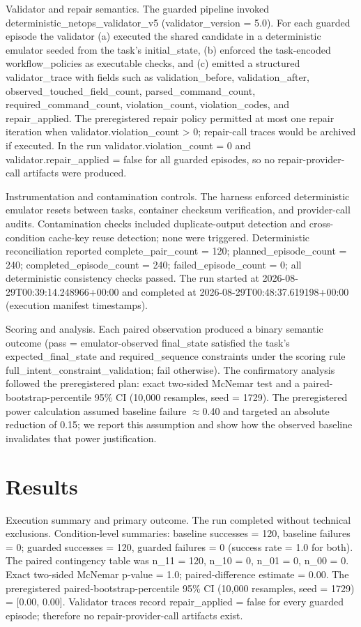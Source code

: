 \documentclass[conference]{IEEEtran}
\begin{document}
Validator and repair semantics. The guarded pipeline invoked deterministic\_netops\_validator\_v5 (validator\_version = 5.0). For each guarded episode the validator (a) executed the shared candidate in a deterministic emulator seeded from the task's initial\_state, (b) enforced the task-encoded workflow\_policies as executable checks, and (c) emitted a structured validator\_trace with fields such as validation\_before, validation\_after, observed\_touched\_field\_count, parsed\_command\_count, required\_command\_count, violation\_count, violation\_codes, and repair\_applied. The preregistered repair policy permitted at most one repair iteration when validator.violation\_count > 0; repair-call traces would be archived if executed. In the run validator.violation\_count = 0 and validator.repair\_applied = false for all guarded episodes, so no repair-provider-call artifacts were produced.

Instrumentation and contamination controls. The harness enforced deterministic emulator resets between tasks, container checksum verification, and provider-call audits. Contamination checks included duplicate-output detection and cross-condition cache-key reuse detection; none were triggered. Deterministic reconciliation reported complete\_pair\_count = 120; planned\_episode\_count = 240; completed\_episode\_count = 240; failed\_episode\_count = 0; all deterministic consistency checks passed. The run started at 2026-08-29T00:39:14.248966+00:00 and completed at 2026-08-29T00:48:37.619198+00:00 (execution manifest timestamps).

Scoring and analysis. Each paired observation produced a binary semantic outcome (pass = emulator-observed final\_state satisfied the task's expected\_final\_state and required\_sequence constraints under the scoring rule full\_intent\_constraint\_validation; fail otherwise). The confirmatory analysis followed the preregistered plan: exact two-sided McNemar test and a paired-bootstrap-percentile 95\% CI (10,000 resamples, seed = 1729). The preregistered power calculation assumed baseline failure \ensuremath{\approx}0.40 and targeted an absolute reduction of 0.15; we report this assumption and show how the observed baseline invalidates that power justification.

\section{Results}
Execution summary and primary outcome. The run completed without technical exclusions. Condition-level summaries: baseline successes = 120, baseline failures = 0; guarded successes = 120, guarded failures = 0 (success rate = 1.0 for both). The paired contingency table was n\_11 = 120, n\_10 = 0, n\_01 = 0, n\_00 = 0. Exact two-sided McNemar p-value = 1.0; paired-difference estimate = 0.00. The preregistered paired-bootstrap-percentile 95\% CI (10,000 resamples, seed = 1729) = [0.00, 0.00]. Validator traces record repair\_applied = false for every guarded episode; therefore no repair-provider-call artifacts exist.
\end{document}
